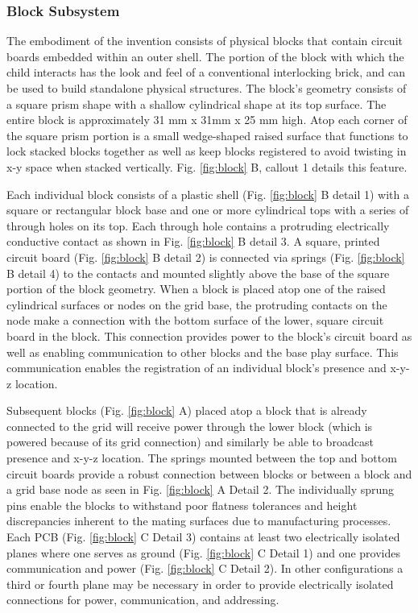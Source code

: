 \documentclass[]{article}
\begin{document}
\subsubsection{Block Subsystem}
The embodiment of the invention consists of physical blocks that contain circuit boards embedded within an outer shell. The portion of the block with which the child interacts has the look and feel of a conventional interlocking brick, and can be used to build standalone physical structures. The block’s geometry consists of a square prism shape with a shallow cylindrical shape at its top surface. The entire block is approximately 31 mm x 31mm x 25 mm high. Atop each corner of the square prism portion is a small wedge-shaped raised surface that functions to lock stacked blocks together as well as keep blocks registered to avoid twisting in x-y space when stacked vertically. Fig. \ref{fig:block} B, callout 1 details this feature.

Each individual block consists of a plastic shell (Fig. \ref{fig:block} B detail 1) with a square or rectangular block base and one or more cylindrical tops with a series of through holes on its top.  Each through hole contains a protruding electrically conductive contact as shown in Fig. \ref{fig:block} B detail 3. A square, printed circuit board (Fig. \ref{fig:block} B detail 2) is connected via springs (Fig. \ref{fig:block} B detail 4) to the contacts and mounted slightly above the base of the square portion of the block geometry. When a block is placed atop one of the raised cylindrical surfaces or nodes on the grid base, the protruding contacts on the node make a connection with the bottom surface of the lower, square circuit board in the block. This connection provides power to the block’s circuit board as well as enabling communication to other blocks and the base play surface. This communication enables the registration of an individual block’s presence and x-y-z location. 

Subsequent blocks (Fig. \ref{fig:block} A) placed atop a block that is already connected to the grid will receive power through the lower block (which is powered because of its grid connection) and similarly be able to broadcast presence and x-y-z location. The springs mounted between the top and bottom circuit boards provide a robust connection between blocks or between a block and a grid base node as seen in Fig. \ref{fig:block} A Detail 2.  The individually sprung pins  enable the blocks to withstand poor flatness tolerances and height discrepancies inherent to the mating surfaces due to manufacturing processes. Each PCB (Fig. \ref{fig:block} C Detail 3) contains at least two electrically isolated planes where one serves as ground (Fig. \ref{fig:block} C Detail 1) and one provides communication and power (Fig. \ref{fig:block} C Detail 2). In other configurations a third or fourth plane may be necessary in order to provide electrically isolated connections for power, communication, and addressing.
\end{document}
